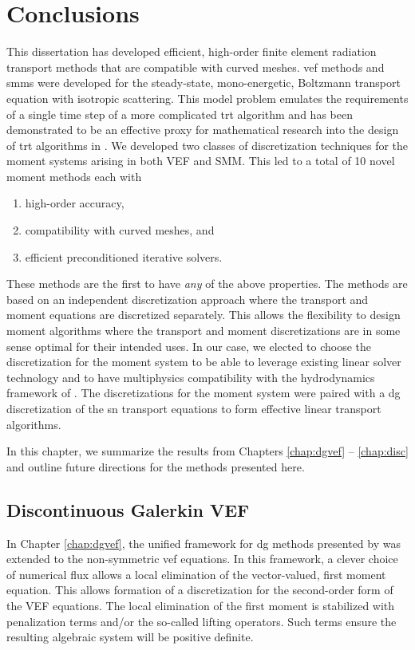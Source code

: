 \documentclass[../doc.tex]{subfiles}
\begin{document}
\chapter{Conclusions} \label{chap:conclusions}
This dissertation has developed efficient, high-order finite element radiation transport methods that are compatible with curved meshes. \gls{vef} methods and \glspl{smm} were developed for the steady-state, mono-energetic, Boltzmann transport equation with isotropic scattering. This model problem emulates the requirements of a single time step of a more complicated \gls{trt} algorithm and has been demonstrated to be an effective proxy for mathematical research into the design of \gls{trt} algorithms in \textcite{yee_mc21}. We developed two classes of discretization techniques for the moment systems arising in both VEF and SMM. This led to a total of 10 novel moment methods each with 
	\begin{enumerate}
		\item high-order accuracy, 
		\item compatibility with curved meshes, and 
		\item efficient preconditioned iterative solvers. 
	\end{enumerate}
These methods are the first to have \emph{any} of the above properties. The methods are based on an independent discretization approach where the transport and moment equations are discretized separately. This allows the flexibility to design moment algorithms where the transport and moment discretizations are in some sense optimal for their intended uses. In our case, we elected to choose the discretization for the moment system to be able to leverage existing linear solver technology and to have multiphysics compatibility with the hydrodynamics framework of \cite{blast}. The discretizations for the moment system were paired with a \gls{dg} discretization of the \gls{sn} transport equations to form effective linear transport algorithms. 

In this chapter, we summarize the results from Chapters \ref{chap:dgvef} -- \ref{chap:disc} and outline future directions for the methods presented here. 

\section{Discontinuous Galerkin VEF}
In Chapter \ref{chap:dgvef}, the unified framework for \gls{dg} methods presented by \textcite{Arnold2002} was extended to the non-symmetric \gls{vef} equations. In this framework, a clever choice of numerical flux allows a local elimination of the vector-valued, first moment equation. This allows formation of a discretization for the second-order form of the VEF equations. The local elimination of the first moment is stabilized with penalization terms and/or the so-called lifting operators. Such terms ensure the resulting algebraic system will be positive definite. 
\end{document}
